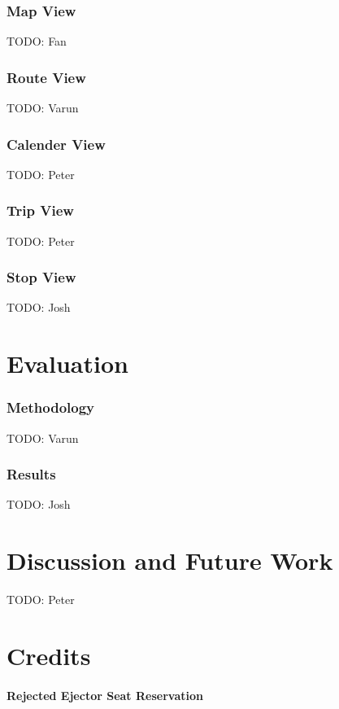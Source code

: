 \documentclass[journal]{vgtc}                %
\begin{document}
\subsubsection{Map View}
TODO: Fan
\subsubsection{Route View}
TODO: Varun
\subsubsection{Calender View}
TODO: Peter
\subsubsection{Trip View}
TODO: Peter
\subsubsection{Stop View}
TODO: Josh

\section{Evaluation}
\subsubsection{Methodology}
TODO: Varun
\subsubsection{Results}
TODO: Josh

\section{Discussion and Future Work}
TODO: Peter

\section{Credits}

\paragraph{Rejected Ejector Seat Reservation}




\end{document}
